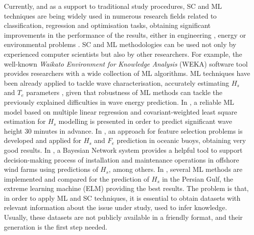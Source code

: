 \documentclass[energies,article,submit,moreauthors,pdftex]{Definitions/mdpi}
\begin{document}
		Currently, and as a support to traditional study procedures, SC and ML techniques \cite{Sang-Yong2014,Bishop:2006:PRM:1162264} are being widely used in numerous research fields related to classification, regression and optimisation tasks, obtaining significant improvements in the performance of the results, either in engineering \cite{Alizadeh2020}, energy or environmental problems \cite{Fi-John2019,Mosavi2019,GUO201816}. SC and ML methodologies can be used not only by experienced computer scientists but also by other researchers. For example, the well-known \textit{Waikato Environment for Knowledge Analysis} (WEKA) \cite{WEKA} software tool provides researchers with a wide collection of ML  algorithms. ML techniques have been already applied to tackle wave characterisation, accurately estimating $H_{s}$ and $T_{e}$ parameters \cite{DURANROSAL2017268, KUMAR2017605}, given that robustness of ML methods can tackle the previously explained difficulties in wave energy prediction. In \cite{Ali2020}, a reliable ML model based on multiple linear regression and covariant-weighted least square estimation for $H_s$ modelling is presented in order to predict significant wave height 30 minutes in advance. In \cite{Cornejo-Bueno2016}, an  approach for feature selection problems is developed and applied for $H_s$ and $F_e$ prediction in oceanic buoys, obtaining very good results. In \cite{Emmanouil2020}, a Bayesian Network system provides a helpful tool to support decision-making process of installation and maintenance operations in offshore wind farms using predictions of $H_s$, among others. In \cite{Shamshirband2020}, several ML methods are implemented and compared for the prediction of $H_s$ in the Persian Gulf, the extreme learning machine (ELM) providing the best results. The problem is that, in order to apply ML and SC techniques, it is essential to obtain datasets with relevant information about the issue under study, used to infer knowledge. Usually, these datasets are not publicly available in a friendly format, and their generation is the first step needed.
		
\end{document}
